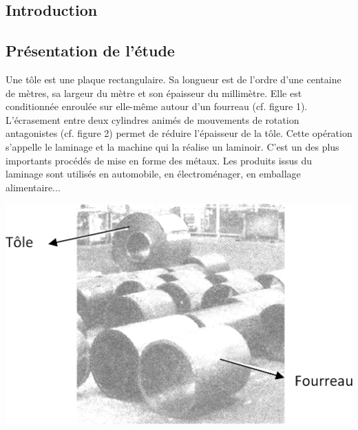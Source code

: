 \documentclass[10pt,fleqn]{article} %
\begin{document}

\vspace{8cm}
\pagestyle{fancy}
\thispagestyle{plain}


\def\columnseprulecolor{\color{ocre}}
\setlength{\columnseprule}{0.4pt} 


\begin{multicols}{2}

\section*{Introduction}
\subsection*{Présentation de l'étude}

Une tôle est une plaque rectangulaire. Sa longueur est de l'ordre d'une centaine de mètres, sa largeur du mètre et son épaisseur du millimètre. Elle est conditionnée enroulée sur elle-même autour d'un fourreau (cf. figure 1). L'écrasement entre deux cylindres animés de mouvements de rotation antagonistes (cf. figure 2) permet de réduire l'épaisseur de la tôle. Cette opération s'appelle le laminage et la machine qui la réalise un laminoir. C'est un des plus importants procédés de mise en forme des métaux. Les produits issus du laminage sont utilisés en automobile, en électroménager, en emballage alimentaire...

\vspace{.25cm}

\noindent\begin{minipage}[c]{.48\linewidth}
\begin{center}
\includegraphics[width=.95\linewidth]{images/figure_01}


\end{center}
\end{minipage}
\end{multicols}
\end{document}
